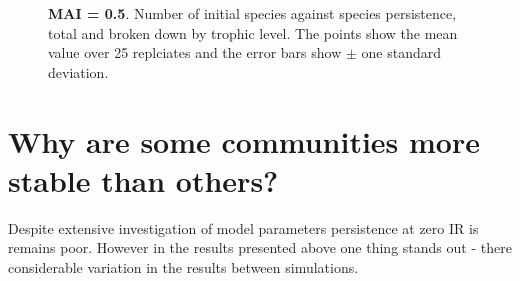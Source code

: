 \begin{figure}
	\centering	
	\renewcommand{\thesubfigure}{}
	\setlength{\subfloatlabelskip}{0pt}
	\caption{\textbf{MAI = 0.5}. Number of initial species against species persistence, total and broken down by trophic level. The points show the mean value over 25 replciates and the error bars show $\pm$ one standard deviation.}
	\label{fig:nsp_v_comp_mai05}
\end{figure}

\newpage
\section{Why are some communities more stable than others?}


Despite extensive investigation of model parameters persistence at zero IR is remains poor. However in the results presented above one thing stands out - there considerable variation in the results between simulations. 

